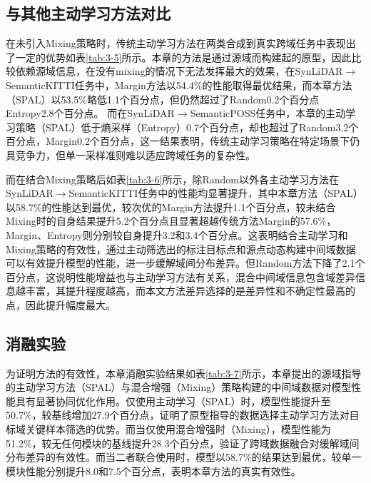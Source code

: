 \subsection{与其他主动学习方法对比}
在未引入Mixing策略时，传统主动学习方法在两类合成到真实跨域任务中表现出了一定的优势如表\ref{tab:3-5}所示。本章的方法是通过源域而构建起的原型，因此比较依赖源域信息，在没有mixing的情况下无法发挥最大的效果，在SynLiDAR$\to$SemanticKITTI任务中，Margin方法以54.4\%的性能取得最优结果，而本章方法（SPAL）以53.5\%略低1.1个百分点，但仍然超过了Random0.2个百分点Entropy2.8个百分点。
而在SynLiDAR$\to$SemanticPOSS任务中，本章的主动学习策略（SPAL）低于熵采样（Entropy）0.7个百分点，却也超过了Random3.2个百分点，Margin0.2个百分点，这一结果表明，传统主动学习策略在特定场景下仍具竞争力，但单一采样准则难以适应跨域任务的复杂性。
\vspace{0.1cm}


而在结合Mixing策略后如表\ref{tab:3-6}所示，除Random以外各主动学习方法在SynLiDAR$\to$SemanticKITTI任务中的性能均显著提升，其中本章方法（SPAL）以58.7\%的性能达到最优，较次优的Margin方法提升1.1个百分点，较未结合Mixing时的自身结果提升5.2个百分点且显著超越传统方法Margin的57.6\%，Margin、Entropy则分别较自身提升3.2和3.4个百分点。这表明结合主动学习和Mixing策略的有效性，通过主动筛选出的标注目标点和源点动态构建中间域数据可以有效提升模型的性能，进一步缓解域间分布差异。但Random方法下降了2.1个百分点，这说明性能增益也与主动学习方法有关系，混合中间域信息包含域差异信息越丰富，其提升程度越高，而本文方法差异选择的是差异性和不确定性最高的点，因此提升幅度最大。
\vspace{0.1cm}


\subsection{消融实验}
为证明方法的有效性，本章消融实验结果如表\ref{tab:3-7}所示，本章提出的源域指导的主动学习方法（SPAL）与混合增强（Mixing）策略构建的中间域数据对模型性能具有显著协同优化作用。仅使用主动学习（SPAL）时，模型性能提升至50.7\%，较基线增加27.9个百分点，证明了原型指导的数据选择主动学习方法对目标域关键样本筛选的优势。而当仅使用混合增强时（Mixing），模型性能为51.2\%，较无任何模块的基线提升28.3个百分点，验证了跨域数据融合对缓解域间分布差异的有效性。而当二者联合使用时，模型以58.7\%的结果达到最优，较单一模块性能分别提升8.0和7.5个百分点，表明本章方法的真实有效性。
\vspace{0.1cm}


